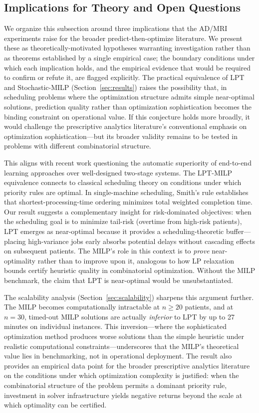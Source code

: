\documentclass[11pt,a4paper]{article}
\begin{document}
\subsection{Implications for Theory and Open Questions}
\label{sec:theory}

We organize this subsection around three implications that the AD/MRI experiments raise for the broader predict-then-optimize literature. We present these as theoretically-motivated hypotheses warranting investigation rather than as theorems established by a single empirical case; the boundary conditions under which each implication holds, and the empirical evidence that would be required to confirm or refute it, are flagged explicitly. The practical equivalence of LPT and Stochastic-MILP (Section~\ref{sec:results}) raises the possibility that, in scheduling problems where the optimization structure admits simple near-optimal solutions, prediction quality rather than optimization sophistication becomes the binding constraint on operational value. If this conjecture holds more broadly, it would challenge the prescriptive analytics literature's conventional emphasis on optimization sophistication---but its broader validity remains to be tested in problems with different combinatorial structure.

This aligns with recent work questioning the automatic superiority of end-to-end learning approaches over well-designed two-stage systems. The LPT-MILP equivalence connects to classical scheduling theory on conditions under which priority rules are optimal. In single-machine scheduling, Smith's rule establishes that shortest-processing-time ordering minimizes total weighted completion time. Our result suggests a complementary insight for risk-dominated objectives: when the scheduling goal is to minimize tail-risk (overtime from high-risk patients), LPT emerges as near-optimal because it provides a scheduling-theoretic buffer---placing high-variance jobs early absorbs potential delays without cascading effects on subsequent patients. The MILP's role in this context is to \textit{prove} near-optimality rather than to improve upon it, analogous to how LP relaxation bounds certify heuristic quality in combinatorial optimization. Without the MILP benchmark, the claim that LPT is near-optimal would be unsubstantiated.

The scalability analysis (Section~\ref{sec:scalability}) sharpens this argument further. The MILP becomes computationally intractable at $n \geq 20$ patients, and at $n = 30$, timed-out MILP solutions are actually \textit{inferior} to LPT by up to 27 minutes on individual instances. This inversion---where the sophisticated optimization method produces worse solutions than the simple heuristic under realistic computational constraints---underscores that the MILP's theoretical value lies in benchmarking, not in operational deployment. The result also provides an empirical data point for the broader prescriptive analytics literature on the conditions under which optimization complexity is justified: when the combinatorial structure of the problem permits a dominant priority rule, investment in solver infrastructure yields negative returns beyond the scale at which optimality can be certified.
\end{document}
